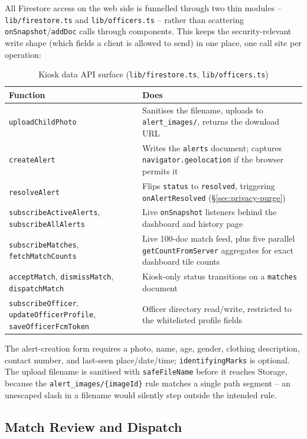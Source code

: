 \documentclass[12pt,a4paper,oneside]{report}
\newcommand{\code}[1]{\texttt{#1}}
\begin{document}
All Firestore access on the web side is funnelled through two thin
modules -- \code{lib/firestore.ts} and \code{lib/officers.ts} -- rather
than scattering \code{onSnapshot}/\code{addDoc} calls through components.
This keeps the security-relevant write shape (which fields a client is
allowed to send) in one place, one call site per operation:

\begin{table}[H]
\centering
\caption{Kiosk data API surface (\texttt{lib/firestore.ts}, \texttt{lib/officers.ts})}
\begin{tabular}{|p{4.4cm}|p{8.1cm}|}
\hline
\textbf{Function} & \textbf{Does} \\
\hline
\code{uploadChildPhoto} & Sanitises the filename, uploads to \code{alert\_images/}, returns the download URL \\ \hline
\code{createAlert} & Writes the \code{alerts} document; captures \code{navigator.geolocation} if the browser permits it \\ \hline
\code{resolveAlert} & Flips \code{status} to \code{resolved}, triggering \code{onAlertResolved} (\S\ref{sec:privacy-purge}) \\ \hline
\code{subscribeActiveAlerts}, \code{subscribeAllAlerts} & Live \code{onSnapshot} listeners behind the dashboard and history page \\ \hline
\code{subscribeMatches}, \code{fetchMatchCounts} & Live 100-doc match feed, plus five parallel \code{getCountFromServer} aggregates for exact dashboard tile counts \\ \hline
\code{acceptMatch}, \code{dismissMatch}, \code{dispatchMatch} & Kiosk-only status transitions on a \code{matches} document \\ \hline
\code{subscribeOfficer}, \code{updateOfficerProfile}, \code{saveOfficerFcmToken} & Officer directory read/write, restricted to the whitelisted profile fields \\
\hline
\end{tabular}
\end{table}

The alert-creation form requires a photo, name, age, gender, clothing
description, contact number, and last-seen place/date/time; \code{identifyingMarks}
is optional. The upload filename is sanitised with \code{safeFileName}
before it reaches Storage, because the \code{alert\_images/\{imageId\}}
rule matches a single path segment -- an unescaped slash in a filename
would silently step outside the intended rule.

\subsection{Match Review and Dispatch}
\end{document}

